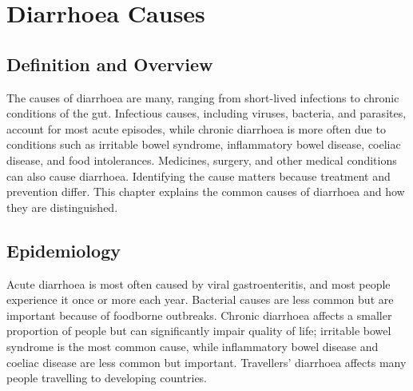 \chapter{Diarrhoea Causes}

\section*{Definition and Overview}
The causes of diarrhoea are many, ranging from short-lived infections to chronic conditions of the gut. Infectious causes, including viruses, bacteria, and parasites, account for most acute episodes, while chronic diarrhoea is more often due to conditions such as irritable bowel syndrome, inflammatory bowel disease, coeliac disease, and food intolerances. Medicines, surgery, and other medical conditions can also cause diarrhoea. Identifying the cause matters because treatment and prevention differ. This chapter explains the common causes of diarrhoea and how they are distinguished.

\section*{Epidemiology}
Acute diarrhoea is most often caused by viral gastroenteritis, and most people experience it once or more each year. Bacterial causes are less common but are important because of foodborne outbreaks. Chronic diarrhoea affects a smaller proportion of people but can significantly impair quality of life; irritable bowel syndrome is the most common cause, while inflammatory bowel disease and coeliac disease are less common but important. Travellers' diarrhoea affects many people travelling to developing countries.

